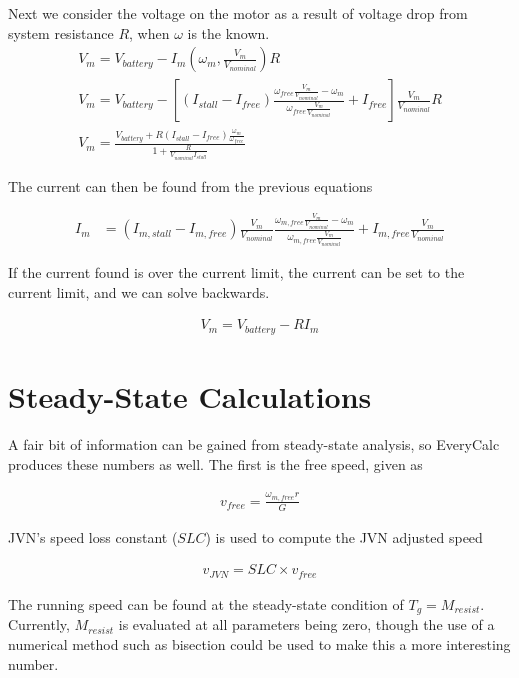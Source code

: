 \documentclass[10pt,letterpaper]{article}
\begin{document}
	Next we consider the voltage on the motor as a result of voltage drop from system resistance $R$, when $\omega$ is the known.
	\begin{align}
		V_{m} = V_{battery} - I_{m}(\omega_m, \frac{V_{m}}{V_{nominal}}) R \\
		V_{m} = V_{battery} - [(I_{stall} - I_{free})\frac{\omega_{free}\frac{V_{m}}{V_{nominal}} - \omega_{m} }{\omega_{free}\frac{V_{m}}{V_{nominal}}} + I_{free}] \frac{V_{m}}{V_{nominal}} R \\
		V_{m} = \frac{V_{battery} + R (I_{stall}-I_{free}) \frac{\omega_m}{\omega_{free}}}{1 + \frac{R}{V_{nominal} I_{stall}} }
	\end{align}

	The current can then be found from the previous equations

	\begin{align}
		I_m  &= (I_{m,stall} - I_{m,free}) \frac{V_{m}}{V_{nominal}} \frac{\omega_{m,free} \frac{V_{m}}{V_{nominal}}-\omega_m}{\omega_{m,free} \frac{V_{m}}{V_{nominal}}} + I_{m,free} \frac{V_{m}}{V_{nominal}} \nonumber
	\end{align}

	If the current found is over the current limit, the current can be set to the current limit, and we can solve backwards. 

	\begin{align}
		V_{m} = V_{battery} - R I_{m}
	\end{align}

	\section{Steady-State Calculations}
	A fair bit of information can be gained from steady-state analysis, so EveryCalc produces these numbers as well. The first is the free speed, given as

	\begin{align}
		v_{free} = \frac{\omega_{m,free} r}{G}
	\end{align}

	JVN's speed loss constant ($SLC$) is used to compute the JVN adjusted speed

	\begin{align}
		v_{JVN} = SLC \times v_{free}
	\end{align}

	The running speed can be found at the steady-state condition of $T_g = M_{resist}$. Currently, $M_{resist}$ is evaluated at all parameters being zero, though the use of a numerical method such as bisection could be used to make this a more interesting number.
\end{document}
